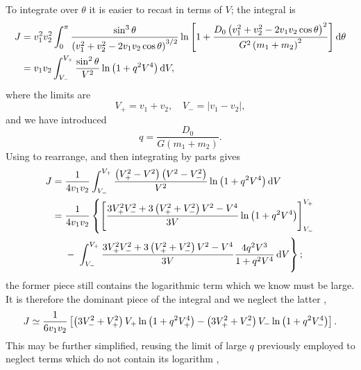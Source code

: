 To integrate over $\theta$ it is easier to recast in terms of $V$; the integral is
\begin{align}
J = {} & v_1^2 v_2^2 \int_{0}^{\pi}{\dfrac{\sin^3\theta}{\left(v_1^2 + v_2^2 - 2v_1 v_2 \cos\theta\right)^{3/2}}\ln\left[1 + \dfrac{D_0\left(v_1^2 + v_2^2 - 2v_1 v_2 \cos\theta\right)^2}{G^2\left(m_1 + m_2\right)^2}\right]}\,\mathrm{d}{\theta} \\
 = {} & v_1 v_2 \int_{V_-}^{V_+}{\dfrac{\sin^2\theta}{V^2}\ln\left(1 + q^2V^4\right)}\,\mathrm{d}{V},
\end{align}
where the limits are
\begin{equation}
V_+ = v_1 + v_2, \quad V_- = |v_1 - v_2|,
\end{equation}
and we have introduced
\begin{equation}
q = \dfrac{D_0}{G\left(m_1+m_2\right)}.
\end{equation}
Using  to rearrange, and then integrating by parts gives
\begin{align}
J = {} & \recip{4 v_1 v_2} \intd{V_-}{V_+}{\dfrac{\left(V_+^2 - V^2\right)\left(V^2 - V_-^2\right)}{V^2}\ln\left(1 + q^2V^4\right)}{V} \nonumber \\
 = {} & \recip{4 v_1 v_2} \left\{\left[\dfrac{3V_+^2V_-^2 + 3\left(V_+^2 + V_-^2\right)V^2 - V^4}{3V} \ln\left(1 + q^2V^4\right)\right]^{V_+}_{V_-} \right. \nonumber \\* 
 {} & - \left. \vphantom{\left[\dfrac{\left(V_+^2\right)V^2}{3V}\right]^{V_+}_{V_-}} \intd{V_-}{V_+}{\dfrac{3V_+^2V_-^2 + 3\left(V_+^2 + V_-^2\right)V^2 - V^4}{3V}\dfrac{4q^2V^3}{1+ q^2V^4}}{V}\right\};
\end{align}
the former piece still contains the logarithmic term which we know must be large. It is therefore the dominant piece of the integral and we neglect the latter \citep{Chandrasekhar1941a},
\begin{equation}
J \simeq \dfrac{1}{6 v_1 v_2} \left[\left(3V_-^2 + V_+^2\right)V_+\ln\left(1 + q^2V_+^4\right) - \left(3V_+^2 + V_-^2\right)V_-\ln\left(1 + q^2V_-^4\right)\right].
\end{equation}
This may be further simplified, reusing the limit of large $q$ previously employed to neglect terms which do not contain its logarithm \citep{Chandrasekhar1941a,Chandrasekhar1941b},
